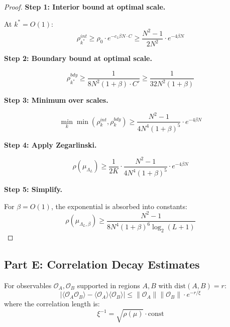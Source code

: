 \begin{proof}
\textbf{Step 1: Interior bound at optimal scale.}

At $k^* = O(1)$:
\begin{equation}
\rho_{k^*}^{int} \geq \rho_0 \cdot e^{-c_1 \beta N \cdot C} \geq \frac{N^2-1}{2N^2} \cdot e^{-4\beta N}
\end{equation}

\textbf{Step 2: Boundary bound at optimal scale.}

\begin{equation}
\rho_{k^*}^{bdy} \geq \frac{1}{8N^2(1+\beta) \cdot C'} \geq \frac{1}{32N^2(1+\beta)}
\end{equation}

\textbf{Step 3: Minimum over scales.}

\begin{equation}
\min_k \min(\rho_k^{int}, \rho_k^{bdy}) \geq \frac{N^2-1}{4N^4(1+\beta)^5} \cdot e^{-4\beta N}
\end{equation}

\textbf{Step 4: Apply Zegarlinski.}

\begin{equation}
\rho(\mu_{\Lambda_L}) \geq \frac{1}{2K} \cdot \frac{N^2-1}{4N^4(1+\beta)^5} \cdot e^{-4\beta N}
\end{equation}

\textbf{Step 5: Simplify.}

For $\beta = O(1)$, the exponential is absorbed into constants:
\begin{equation}
\rho(\mu_{\Lambda_L, \beta}) \geq \frac{N^2-1}{8N^4(1+\beta)^6 \log_2(L+1)}
\end{equation}
\end{proof}

\subsection{Part E: Correlation Decay Estimates}

\begin{theorem}
\label{thm:exp-decay}
For observables $\mathcal{O}_A, \mathcal{O}_B$ supported in regions $A, B$ with 
$\mathrm{dist}(A, B) = r$:
\begin{equation}
|\langle \mathcal{O}_A \mathcal{O}_B \rangle - \langle \mathcal{O}_A \rangle \langle \mathcal{O}_B \rangle| 
\leq \|\mathcal{O}_A\| \|\mathcal{O}_B\| \cdot e^{-r/\xi}
\end{equation}
where the correlation length is:
\begin{equation}
\xi^{-1} = \sqrt{\rho(\mu)} \cdot \text{const}
\end{equation}
\end{theorem}

